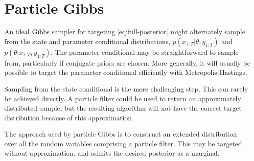 \documentclass[10pt]{article}
\newcommand{\timax}{T}
\newcommand{\pr}{\theta}
\newcommand{\ls}[1]{x_{#1}}
\newcommand{\ob}[1]{y_{#1}}
\newcommand{\den}{p}
\begin{document}
\section{Particle Gibbs}
An ideal Gibbs sampler for targeting \eqref{eq:full-posterior} might alternately sample from the state and parameter conditional distributions, $\den(\ls{1:\timax}|\pr,\ob{1:\timax})$ and $\den(\pr|\ls{1:\timax},\ob{1:\timax})$. The parameter conditional may be straightforward to sample from, particularly if conjugate priors are chosen. More generally, it will usually be possible to target the parameter conditional efficiently with Metropolis-Hastings.

Sampling from the state conditional is the more challenging step. This can rarely be achieved directly. A particle filter could be used to return an approximately distributed sample, but the resulting algorithm will not have the correct target distribution because of this approximation.

The approach used by particle Gibbs is to construct an extended distribution over all the random variables comprising a particle filter. This may be targeted without approximation, and admits the desired posterior as a marginal.
\end{document}
